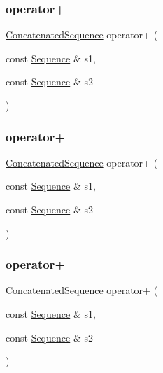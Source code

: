 \subsubsection{\texorpdfstring{operator+}{operator+}\hspace{0.1cm}{\footnotesize\ttfamily [6/9]}}
{\footnotesize\ttfamily \mbox{\hyperlink{classfakeit_1_1ConcatenatedSequence}{Concatenated\+Sequence}} operator+ (\begin{DoxyParamCaption}\item[{const \mbox{\hyperlink{classfakeit_1_1Sequence}{Sequence}} \&}]{s1,  }\item[{const \mbox{\hyperlink{classfakeit_1_1Sequence}{Sequence}} \&}]{s2 }\end{DoxyParamCaption})\hspace{0.3cm}{\ttfamily [friend]}}

\mbox{\label{classfakeit_1_1ConcatenatedSequence_adb09b1b1e32428d0c2f46bd549141cdd}} 
\subsubsection{\texorpdfstring{operator+}{operator+}\hspace{0.1cm}{\footnotesize\ttfamily [7/9]}}
{\footnotesize\ttfamily \mbox{\hyperlink{classfakeit_1_1ConcatenatedSequence}{Concatenated\+Sequence}} operator+ (\begin{DoxyParamCaption}\item[{const \mbox{\hyperlink{classfakeit_1_1Sequence}{Sequence}} \&}]{s1,  }\item[{const \mbox{\hyperlink{classfakeit_1_1Sequence}{Sequence}} \&}]{s2 }\end{DoxyParamCaption})\hspace{0.3cm}{\ttfamily [friend]}}

\mbox{\label{classfakeit_1_1ConcatenatedSequence_adb09b1b1e32428d0c2f46bd549141cdd}} 
\subsubsection{\texorpdfstring{operator+}{operator+}\hspace{0.1cm}{\footnotesize\ttfamily [8/9]}}
{\footnotesize\ttfamily \mbox{\hyperlink{classfakeit_1_1ConcatenatedSequence}{Concatenated\+Sequence}} operator+ (\begin{DoxyParamCaption}\item[{const \mbox{\hyperlink{classfakeit_1_1Sequence}{Sequence}} \&}]{s1,  }\item[{const \mbox{\hyperlink{classfakeit_1_1Sequence}{Sequence}} \&}]{s2 }\end{DoxyParamCaption})\hspace{0.3cm}{\ttfamily [friend]}}

